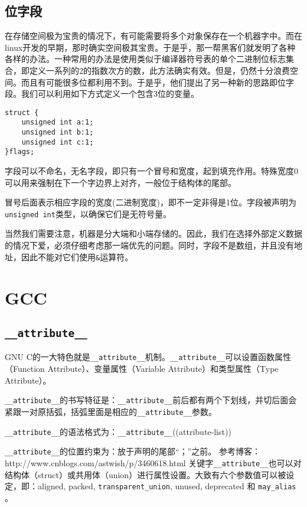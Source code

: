 		\subsection{位字段}
			在存储空间极为宝贵的情况下，有可能需要将多个对象保存在一个机器字中。而在linux开发的早期，那时确实空间极其宝贵。于是乎，那一帮黑客们就发明了各种各样的办法。一种常用的办法是使用类似于编译器符号表的单个二进制位标志集合，即定义一系列的2的指数次方的数，此方法确实有效。但是，仍然十分浪费空间。而且有可能很多位都利用不到。于是乎，他们提出了另一种新的思路即位字段。我们可以利用如下方式定义一个包含3位的变量。

\begin{verbatim}
struct {
	unsigned int a:1;
	unsigned int b:1;
	unsigned int c:1;
}flags;
\end{verbatim}
			
			字段可以不命名，无名字段，即只有一个冒号和宽度，起到填充作用。特殊宽度0可以用来强制在下一个字边界上对齐，一般位于结构体的尾部。
			
			冒号后面表示相应字段的宽度(二进制宽度)，即不一定非得是1位。字段被声明为\texttt{unsigned int}类型，以确保它们是无符号量。

			当然我们需要注意，机器是分大端和小端存储的。因此，我们在选择外部定义数据的情况下爱，必须仔细考虑那一端优先的问题。同时，字段不是数组，并且没有地址，因此不能对它们使用\texttt{&}运算符。	
	\section{GCC}
		\subsection{\texttt{__attribute__}}
			GNU C的一大特色就是\texttt{__attribute__}机制。\texttt{__attribute__}可以设置函数属性（Function Attribute）、变量属性（Variable Attribute）和类型属性（Type Attribute）。

			\texttt{__attribute__}的书写特征是：\texttt{__attribute__}前后都有两个下划线，并切后面会紧跟一对原括弧，括弧里面是相应的\texttt{__attribute__}参数。

			\texttt{__attribute__}的语法格式为：\texttt{__attribute__}((attribute-list))

			\texttt{__attribute__}的位置约束为：放于声明的尾部“；”之前。
			参考博客：http://www.cnblogs.com/astwish/p/3460618.html
			关键字\texttt{__attribute__}也可以对结构体（struct）或共用体（union）进行属性设置。大致有六个参数值可以被设定，即：aligned, packed, \texttt{transparent_union}, unused, deprecated 和 \texttt{may_alias} 。

